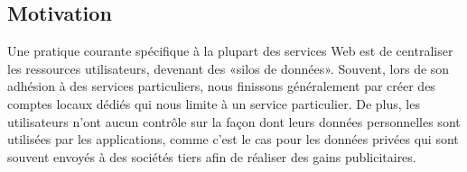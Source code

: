 \documentclass[a4paper]{article}
\begin{document}
\subsection{Motivation}
\label{sec:statement}
Une pratique courante spécifique à la plupart des services Web est de centraliser les ressources utilisateurs, devenant des «silos de données». Souvent, lors de son adhésion à des services particuliers, nous finissons généralement par créer des comptes locaux dédiés qui nous limite à un service particulier. De plus, les utilisateurs n'ont aucun contrôle sur la façon dont leurs données personnelles sont utilisées par les applications, comme c'est le cas pour les données privées qui sont souvent envoyés à des sociétés tiers afin de réaliser des gains publicitaires.\\
\end{document}
